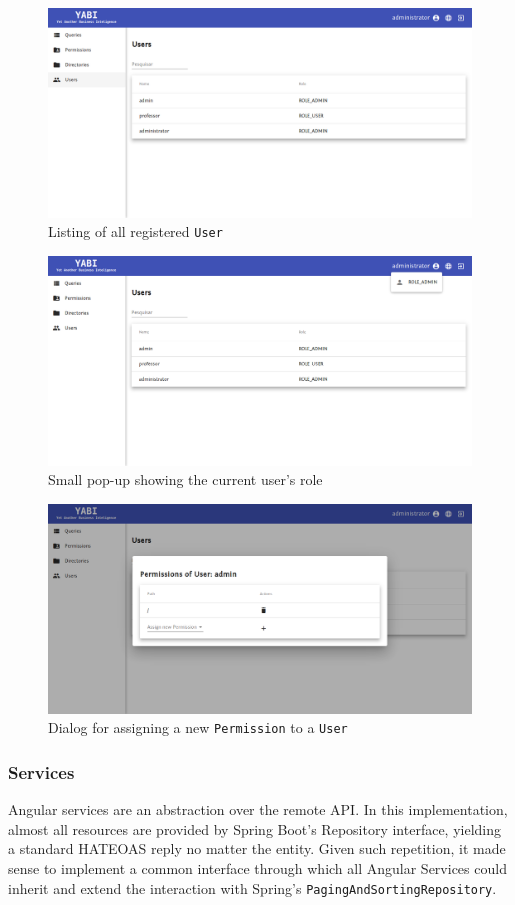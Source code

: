 \begin{figure}
  \centering
  \includegraphics[width=.8\textwidth]{images/screenshots/user/user-listing}
  \caption{Listing of all registered \texttt{User}}\label{fig:userlist}
\end{figure}

\begin{figure}
  \centering
  \includegraphics[width=.8\textwidth]{images/screenshots/user/admin-role}
  \caption{Small pop-up showing the current user's role}\label{fig:userrole}
\end{figure}

\begin{figure}
  \centering
  \includegraphics[width=.8\textwidth]{images/screenshots/user/admin-permission-new}
  \caption{Dialog for assigning a new \texttt{Permission} to a \texttt{User}}\label{fig:adminpermisisonnew}
\end{figure}

\subsubsection{Services}
Angular services are an abstraction over the remote \gls{API}. In this implementation, almost all resources are provided by Spring Boot's Repository interface, yielding a standard \gls{HATEOAS} reply no matter the entity. Given such repetition, it made sense to implement a common interface through which all Angular Services could inherit and extend the interaction with Spring's \texttt{PagingAndSortingRepository}.

